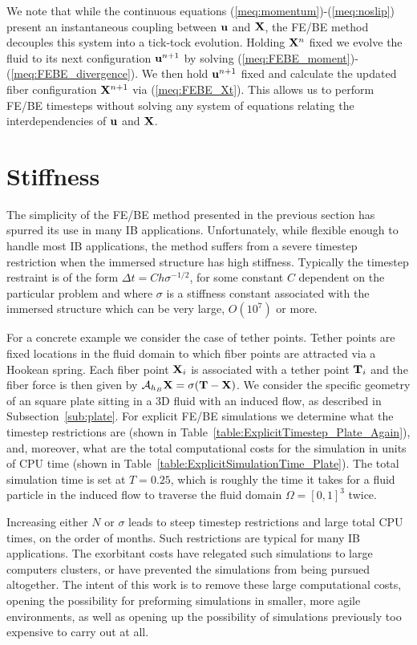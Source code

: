 We note that while the continuous equations (\ref{meq:momentum})-(\ref{meq:noslip}) present an instantaneous coupling between $\mathbf{u}$ and $\mathbf{X}$, the FE/BE method decouples this system into a tick-tock evolution. Holding $\mathbf{X}^n$ fixed we evolve the fluid to its next configuration $\mathbf{u}^{n+1}$ by solving (\ref{meq:FEBE_moment})-(\ref{meq:FEBE_divergence}). We then hold $\mathbf{u}^{n+1}$ fixed and calculate the updated fiber configuration $\mathbf{X}^{n+1}$ via (\ref{meq:FEBE_Xt}). This allows us to perform FE/BE timesteps without solving any system of equations relating the interdependencies of $\mathbf{u}$ and $\mathbf{X}$.


\section{Stiffness}
\label{Sec:Stiffness}

The simplicity of the FE/BE method presented in the previous section has spurred its use in many IB applications. Unfortunately, while flexible enough to handle most IB applications, the method suffers from a severe timestep restriction when the immersed structure has high stiffness. Typically the timestep restraint is of the form $\Delta t = Ch\sigma^{-1/2}$, for some constant $C$ dependent on the particular problem and where $\sigma$ is a stiffness constant associated with the immersed structure which can be very large, $O(10^7)$ or more.

For a concrete example we consider the case of tether points. Tether points are fixed locations in the fluid domain to which fiber points are attracted via a Hookean spring. Each fiber point $\mathbf{X}_i$ is associated with a tether point $\mathbf{T}_i$ and the fiber force is then given by $\mathcal{A}_{h_B}\mathbf{X} = \sigma(\mathbf{T}-\mathbf{X})$. We consider the specific geometry of an square plate sitting in a 3D fluid with an induced flow, as described in Subsection~\ref{sub:plate}. For explicit FE/BE simulations we determine what the timestep restrictions are (shown in Table~\ref{table:ExplicitTimestep_Plate_Again}), and, moreover, what are the total computational costs for the simulation in units of CPU time (shown in Table~\ref{table:ExplicitSimulationTime_Plate}). The total simulation time is set at $T=0.25$, which is roughly the time it takes for a fluid particle in the induced flow to traverse the fluid domain $\Omega=[0,1]^3$ twice.

Increasing either $N$ or $\sigma$ leads to steep timestep restrictions and large total CPU times, on the order of months. Such restrictions are typical for many IB applications. The exorbitant costs have relegated such simulations to large computers clusters, or have prevented the simulations from being pursued altogether. The intent of this work is to remove these large computational costs, opening the possibility for preforming simulations in smaller, more agile environments, as well as opening up the possibility of simulations previously too expensive to carry out at all.

